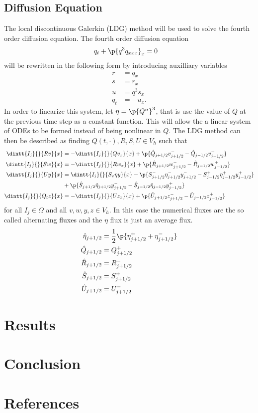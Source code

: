 \documentclass[11pt, oneside]{article}
\begin{document}
\subsection{Diffusion Equation}
  The local discontinuous Galerkin (LDG) method will be used to solve the fourth order
  diffusion equation. 
  The fourth order diffusion equation
  \begin{align*}
    q_t + \p{q^3 q_{xxx}}_x &= 0
  \end{align*}
  will be rewritten in the following form by introducing auxilliary variables
  \begin{align*}
    r &= q_{x} \\
    s &= r_{x} \\
    u &= q^3 s_{x} \\
    q_t &= -u_{x}.
  \end{align*}
  In order to linearize this system, let $\eta = \p{Q^n}^3$, that is use the
  value of $Q$ at the previous time step as a constant function.
  This will allow the a linear system of ODEs to be formed instead of being
  nonlinear in $Q$.
  The LDG method can then be described as finding $Q(t, \cdot), R, S, U \in V_h$
  such that
  \begin{align*}
    \dintt{I_j}{}{R v}{x} &= -\dintt{I_j}{}{Q v_x}{x} + \p{\hat{Q}_{j+1/2}v^-_{j+1/2} - \hat{Q}_{j-1/2} v^+_{j-1/2}} \\
    \dintt{I_j}{}{S w}{x} &= -\dintt{I_j}{}{R w_x}{x} + \p{\hat{R}_{j+1/2}w^-_{j+1/2} - \hat{R}_{j-1/2} w^+_{j-1/2}} \\
    \dintt{I_j}{}{U y}{x} &= \dintt{I_j}{}{S_x \eta y}{x} - \p{S^-_{j+1/2}\eta^-_{j+1/2}y^-_{j+1/2} - S^+_{j-1/2}\eta^+_{j-1/2}y^+_{j-1/2}} \\
    &+ \p{\hat{S}_{j+1/2} \hat{\eta}_{j+1/2} y^-_{j+1/2} - \hat{S}_{j-1/2} \hat{\eta}_{j-1/2} y^+_{j-1/2}} \\
    \dintt{I_j}{}{Q_t z}{x} &= -\dintt{I_j}{}{U z_x}{x} + \p{\hat{U}_{j+1/2}z^-_{j+1/2} - \hat{U}_{j-1/2} z^+_{j-1/2}}
  \end{align*}
  for all $I_j \in \Omega$ and all $v, w, y, z \in V_h$.
  In this case the numerical fluxes are the so called alternating fluxes and the
  $\eta$ flux is just an average flux.
  \begin{align*}
    \hat{\eta}_{j+1/2} &= \frac{1}{2}\p{\eta^+_{j+1/2} + \eta^-_{j+1/2}} \\
    \hat{Q}_{j+1/2} &= Q^+_{j+1/2} \\
    \hat{R}_{j+1/2} &= R^-_{j+1/2} \\
    \hat{S}_{j+1/2} &= S^+_{j+1/2} \\
    \hat{U}_{j+1/2} &= U^-_{j+1/2}
  \end{align*}


\section{Results}

\section{Conclusion}

\section{References}
  \printbibliography{}
\end{document}

